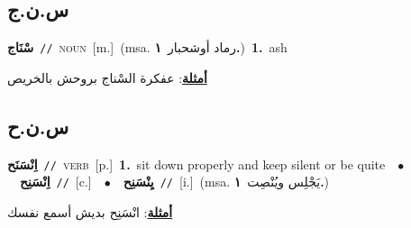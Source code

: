 \documentclass[10pt,a4paper,twoside]{article} %
\begin{document}
\begin{multicols}{2}
\vspace{-3mm}
\subsection*{\color{blue}\foreignlanguage{arabic}{س.ن.ج}\color{blue}{}} 

{\setlength\topsep{0pt}\textbf{\foreignlanguage{arabic}{سْنَاج}}\ {\color{gray}\texttt{//}\color{black}}\ \textsc{noun}\ [m.]\ \color{gray}(msa. \foreignlanguage{arabic}{رماد أوشحبار}~\foreignlanguage{arabic}{\textbf{١.}})\color{black}\ \textbf{1.}~ash\  \begin{flushright}\color{gray}\foreignlanguage{arabic}{\textbf{\underline{\foreignlanguage{arabic}{أمثلة}}}: عفكرة السْناج بروحش بالخريص}\end{flushright}\color{black}} \vspace{2mm}

\vspace{-3mm}
\subsection*{\color{blue}\foreignlanguage{arabic}{س.ن.ح}\color{blue}{}} 

{\setlength\topsep{0pt}\textbf{\foreignlanguage{arabic}{اِنْسَنَح}}\ {\color{gray}\texttt{//}\color{black}}\ \textsc{verb}\ [p.]\ \textbf{1.}~sit down properly and keep silent or be quite\ \ $\bullet$\ \ \setlength\topsep{0pt}\textbf{\foreignlanguage{arabic}{اِنْسَنِح}}\ {\color{gray}\texttt{//}\color{black}}\ [c.]\ \ $\bullet$\ \ \setlength\topsep{0pt}\textbf{\foreignlanguage{arabic}{يِنْسَنِح}}\ {\color{gray}\texttt{//}\color{black}}\ [i.]\ \color{gray}(msa. \foreignlanguage{arabic}{يَجْلِس ويُنْصِت}~\foreignlanguage{arabic}{\textbf{١.}})\color{black}\  \begin{flushright}\color{gray}\foreignlanguage{arabic}{\textbf{\underline{\foreignlanguage{arabic}{أمثلة}}}: انْسَنِح بديش أسمع نفسك}\end{flushright}\color{black}} \vspace{2mm}


\end{multicols}
\end{document}
